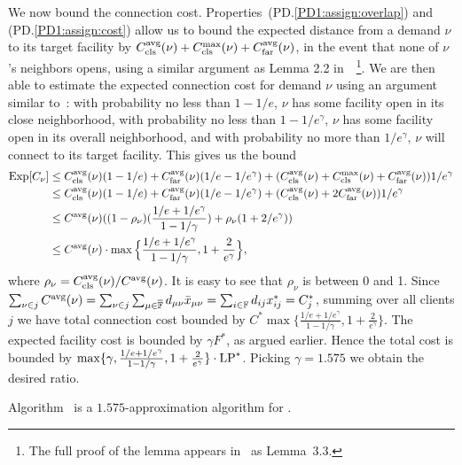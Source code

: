 We now bound the connection
cost. Properties~(PD.\ref{PD1:assign:overlap}) and
(PD.\ref{PD1:assign:cost}) allow us to bound the expected
distance from a demand $\nu$ to its target facility by
$C_{\text{cls}}^{{\mbox{\scriptsize\rm avg}}}(\nu)+C_{\text{cls}}^{\max}(\nu)+C_{\text{far}}^{{\mbox{\scriptsize\rm avg}}}(\nu)$, in the event
that none of $\nu$'s neighbors opens, using a similar
argument as Lemma 2.2 in~\cite{ByrkaGS10}~\footnote{The full
  proof of the lemma appears in~\cite{ByrkaA10} as
  Lemma~3.3.}. We are then able to estimate the expected
connection cost for demand $\nu$ using an argument similar
to~\cite{ByrkaGS10}: with probability
no less than $1-1/e$, $\nu$ has some facility open in its
close neighborhood, with probability no less than
$1-1/e^\gamma$, $\nu$ has some facility open in its overall
neighborhood, and with probability no more than
$1/e^\gamma$, $\nu$ will connect to its target facility.
This gives us the bound
%
\begin{align*}
  \mbox{\rm Exp}[C_{\nu}] &\leq C_{\text{cls}}^{{\mbox{\scriptsize\rm avg}}}(\nu)(1-1/e) +
  C_{\text{far}}^{{\mbox{\scriptsize\rm avg}}}(\nu)(1/e-1/e^\gamma) + (C_{\text{cls}}^{{\mbox{\scriptsize\rm avg}}}(\nu)+C_{\text{cls}}^{\max}(\nu)+C_{\text{far}}^{{\mbox{\scriptsize\rm avg}}}(\nu))1/e^\gamma \\
  &\leq C_{\text{cls}}^{{\mbox{\scriptsize\rm avg}}}(\nu)(1-1/e) +
  C_{\text{far}}^{{\mbox{\scriptsize\rm avg}}}(\nu)(1/e-1/e^\gamma) + (C_{\text{cls}}^{{\mbox{\scriptsize\rm avg}}}(\nu)+2C_{\text{far}}^{{\mbox{\scriptsize\rm avg}}}(\nu))1/e^\gamma\\
  &\leq
  C^{{\mbox{\scriptsize\rm avg}}}(\nu)((1-\rho_{\nu})(\frac{1/e+1/e^\gamma}{1-1/\gamma})
  + \rho_{\nu}(1+2/e^\gamma)) \\
  &\leq C^{{\mbox{\scriptsize\rm avg}}}(\nu) \cdot
  \max\Big\{\frac{1/e+1/e^\gamma}{1-1/\gamma},
  1+\frac{2}{e^\gamma}\Big\},
\end{align*}
%
where $\rho_{\nu}=C_{\text{cls}}^{{\mbox{\scriptsize\rm avg}}}(\nu)/C^{{\mbox{\scriptsize\rm avg}}}(\nu)$. It is easy
to see that $\rho_{\nu}$ is between 0 and 1.
Since $\sum_{\nu\in j} C^{{\mbox{\scriptsize\rm avg}}}(\nu) = \sum_{\nu\in
  j}\sum_{\mu\in\overline{\mathbb{F}}} d_{\mu\nu}{\bar x}_{\mu\nu} =
\sum_{i\in\mathbb{F}} d_{ij}x_{ij}^\ast = C_j^\ast$, summing
over all clients $j$ we have total connection cost bounded
by $C^\ast \max\{\frac{1/e+1/e^\gamma}{1-1/\gamma},
1+\frac{2}{e^\gamma}\}$. The expected facility cost is
bounded by $\gamma F^\ast$, as argued earlier. Hence the
total cost is bounded by $\max\{\gamma,
\frac{1/e+1/e^\gamma}{1-1/\gamma},
1+\frac{2}{e^\gamma}\}\cdot \mbox{\rm LP}^\ast$. Picking
$\gamma=1.575$ we obtain the desired ratio.


\begin{theorem}\label{thm:ebgs}
  Algorithm~{\EBGS} is a $1.575$-approximation algorithm for \FTFP.
\end{theorem}



